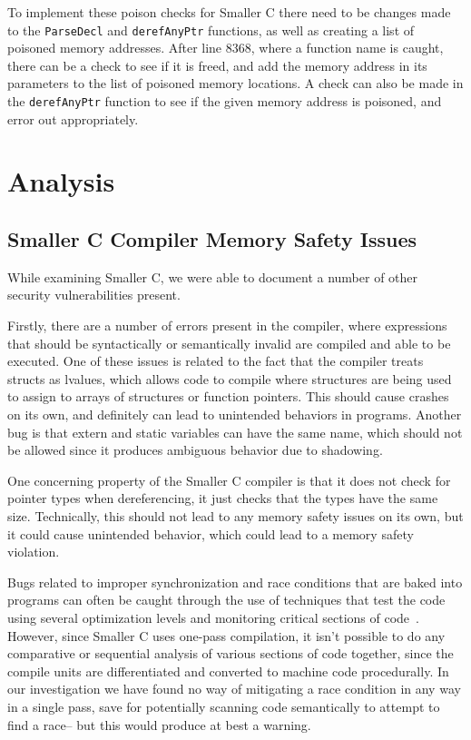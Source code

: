 \documentclass[sigconf, anonymous]{acmart}
\newcommand{\code}[1]{\texttt{#1}}
\begin{document}
To implement these poison checks for Smaller C there need to be changes made to the \code{ParseDecl} and \code{derefAnyPtr} functions, as well as creating a list of poisoned memory addresses. After line 8368, where a function name is caught, there can be a check to see if it is freed, and add the memory address in its parameters to the list of poisoned memory locations. A check can also be made in the \code{derefAnyPtr} function to see if the given memory address is poisoned, and error out appropriately.



\section{Analysis}
\label{analysis}

\subsection{Smaller C Compiler Memory Safety Issues}
While examining Smaller C, we were able to document a number of other security vulnerabilities present.

Firstly, there are a number of errors present in the compiler, where expressions that should be syntactically or semantically invalid are compiled and able to be executed. One of these issues is related to the fact that the compiler treats structs as lvalues, which allows code to compile where structures are being used to assign to arrays of structures or  function pointers. This should cause crashes on its own, and definitely can lead to unintended behaviors in programs. Another bug is that extern and static variables can have the same name, which should not be allowed since it produces ambiguous behavior due to shadowing. 

One concerning property of the Smaller C compiler is that it does not check for pointer types when dereferencing, it just checks that the types have the same size. Technically, this should not lead to any memory safety issues on its own, but it could cause unintended behavior, which could lead to a memory safety violation. 

Bugs related to improper synchronization and race conditions that are baked into programs can often be caught through the use of techniques that test the code using several optimization levels and monitoring critical sections of code~\cite{Li:Finding}. However, since Smaller C uses one-pass compilation, it isn’t possible to do any comparative or sequential analysis of various sections of code together, since the compile units are differentiated and converted to machine code procedurally. In our investigation we have found no way of mitigating a race condition in any way in a single pass, save for potentially scanning code semantically to attempt to find a race– but this would produce at best a warning.
\end{document}
